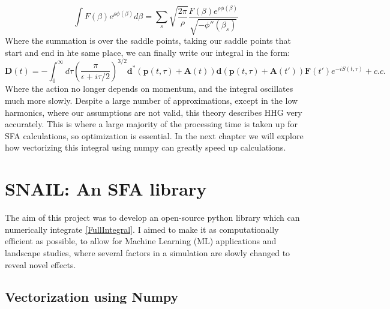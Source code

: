 \documentclass[11pt,a4paper]{report}
\begin{document}
\begin{equation}
\int F(\beta) e^{\rho\phi(\beta)} d\beta = \sum_s \sqrt{\frac{2\pi}{\rho}} \frac{F(\beta)e^{\rho\phi(\beta)}}{\sqrt{-\phi '' (\beta_s)}}
\end{equation}
Where the summation is over the saddle points, taking our saddle points that start and end in hte same place, we can finally write our integral in the form:
\begin{equation}
\mathbf{D}(t) = -\int_0^{\infty} d\tau \left( \frac{\pi}{\epsilon + i\tau/2}\right)^{3/2}\mathbf{d}^* (\mathbf{p}(t,\tau) + \mathbf{A}(t))\mathbf{d} (\mathbf{p}(t,\tau) + \mathbf{A}(t')) \mathbf{F}(t') e^{-iS(t,\tau)} + c.c.
	\label{FullIntegral}
\end{equation}
Where the action no longer depends on momentum, and the integral oscillates much more slowly. Despite a large number of approximations, except in the low harmonics, where our assumptions are not valid, this theory describes HHG very accurately. This is where a large majority of the processing time is taken up for SFA calculations, so optimization is essential. In the next chapter we will explore how vectorizing this integral using numpy can greatly speed up calculations.
\newpage
{}
\chapter*{SNAIL: An SFA library}
\vspace{-10mm}
The aim of this project was to develop an open-source python library which can numerically integrate \eqref{FullIntegral}. I aimed to make it as computationally efficient as possible, to allow for Machine Learning (ML) applications and landscape studies, where several factors in a simulation are slowly changed to reveal novel effects.
\section{Vectorization using Numpy}








\printbibliography
\end{document}
